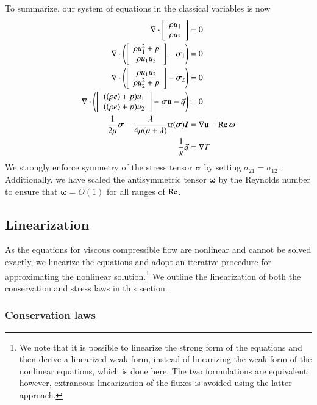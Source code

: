 To summarize, our system of equations in the classical variables is now
\begin{align*}
\div \vecttwo{\rho u_1 }{\rho u_2} &= 0\\
\div \left(\vecttwo{\rho u_1^2+p }{\rho u_1 u_2} - \boldsymbol \sigma_{1}\right) &=0\\
\div \left(\vecttwo{\rho u_1 u_2}{\rho u_2^2+p } - \boldsymbol \sigma_{2}\right) &=0\\
\div \left(\vecttwo{((\rho e)+p)u_1}{((\rho e)+p)u_2} - \boldsymbol\sigma \mathbf{u} - \vec{q}\right) &=0\\
\frac{1}{2\mu} \boldsymbol \sigma - \frac{\lambda}{4\mu (\mu + \lambda)} { \rm tr}(\boldsymbol \sigma) \boldsymbol I &= \grad \mathbf{u} - \Reyn \, {\boldsymbol \omega}\\
\frac{1}{\kappa}\vec{q} &= \grad T
\end{align*}
We strongly enforce symmetry of the stress tensor $\boldsymbol \sigma$ by setting $\sigma_{21} = \sigma_{12}$. Additionally, we have scaled the antisymmetric tensor $\boldsymbol \omega$ by the Reynolds number to ensure that $\boldsymbol \omega = O(1)$ for all ranges of $\Reyn$.  

\subsection{Linearization}

As the equations for viscous compressible flow are nonlinear and cannot be solved exactly, we linearize the equations and adopt an iterative procedure for approximating the nonlinear solution.\footnote{We note that it is possible to linearize the strong form of the equations and then derive a linearized weak form, instead of linearizing the weak form of the nonlinear equations, which is done here.  The two formulations are equivalent; however, extraneous linearization of the fluxes is avoided using the latter approach.}  We outline the linearization of both the conservation and stress laws in this section.

\subsubsection{Conservation laws}

